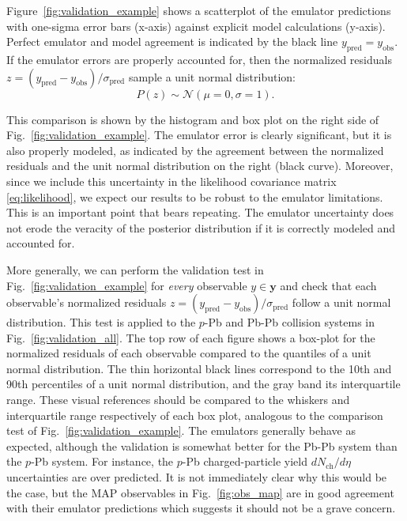 \documentclass[aps,prc,reprint,amsmath,nofootinbib]{revtex4-1}
\newcommand{\nch}{N_\text{ch}}
\newcommand{\yv}{\mathbf y}
\begin{document}
Figure~\ref{fig:validation_example} shows a scatterplot of the emulator predictions with one-sigma error bars (x-axis) against explicit model calculations (y-axis).
Perfect emulator and model agreement is indicated by the black line $y_\text{pred} = y_\text{obs}$.
If the emulator errors are properly accounted for, then the normalized residuals ${z=(y_\text{pred} - y_\text{obs})/\sigma_\text{pred}}$ sample a unit normal distribution:
\begin{equation}
  \label{eq:frac_error}
  P(z) \sim \mathcal{N}(\mu=0,\sigma=1).
\end{equation}

This comparison is shown by the histogram and box plot on the right side of Fig.~\ref{fig:validation_example}.
The emulator error is clearly significant, but it is also properly modeled, as indicated by the agreement between the normalized residuals and the unit normal distribution on the right (black curve).
Moreover, since we include this uncertainty in the likelihood covariance matrix \eqref{eq:likelihood}, we expect our results to be robust to the emulator limitations.
This is an important point that bears repeating.
The emulator uncertainty does not erode the veracity of the posterior distribution if it is correctly modeled and accounted for.

More generally, we can perform the validation test in Fig.~\ref{fig:validation_example} for \emph{every} observable $y \in \yv$ and check that each observable's normalized residuals ${z=(y_\text{pred} - y_\text{obs})/\sigma_\text{pred}}$ follow a unit normal distribution.
This test is applied to the $p$-Pb and Pb-Pb collision systems in Fig.~\ref{fig:validation_all}.
The top row of each figure shows a box-plot for the normalized residuals of each observable compared to the quantiles of a unit normal distribution.
The thin horizontal black lines correspond to the 10th and 90th percentiles of a unit normal distribution, and the gray band its interquartile range.
These visual references should be compared to the whiskers and interquartile range respectively of each box plot, analogous to the comparison test of Fig.~\ref{fig:validation_example}.
The emulators generally behave as expected, although the validation is somewhat better for the Pb-Pb system than the $p$-Pb system.
For instance, the $p$-Pb charged-particle yield $d\nch/d\eta$ uncertainties are over predicted.
It is not immediately clear why this would be the case, but the MAP observables in Fig.~\ref{fig:obs_map} are in good agreement with their emulator predictions which suggests it should not be a grave concern.
\end{document}
